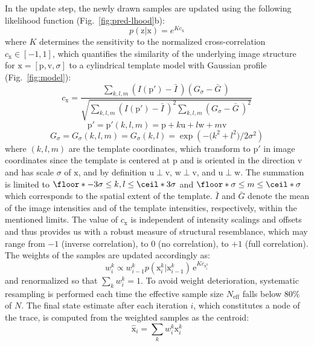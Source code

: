 In the update step, the newly drawn samples are updated using the following likelihood function (Fig.~\ref{fig:pred-lhood}b):
\begin{equation}
p(\mathrm{z} | \mathrm{x}) = e^{K c_{\mathrm{x}}}
\end{equation}
where $K$ determines the sensitivity to the normalized cross-correlation $c_{\mathrm{x}}\in[-1,1]$, which quantifies the similarity of the underlying image structure for $\mathrm{x}=\left[ \mathrm{p}, \mathrm{v}, \sigma \right]$ to a cylindrical template model with Gaussian profile (Fig.~\ref{fig:model}):
\begin{equation}
\label{eq:corr}
c_\mathrm{x} = 
\frac{
\sum_{k,l,m}
\left(I(\mathrm{p}')-\bar{I}\,\right) \left(G_{\sigma}-\bar{G}\,\right)
}{
\!\!\sqrt{
\sum_{k,l,m}\left(I(\mathrm{p}')-\bar{I}\,\right)^2
\sum_{k,l,m}\left(G_{\sigma}-\bar{G}\,\right)^2}
}
\end{equation}
\begin{equation}
\label{eq:pp}
\mathrm{p}' = \mathrm{p}'(k,l,m) =  \mathrm{p} + k \mathrm{u} + l \mathrm{w} + m \mathrm{v}
\end{equation}
\begin{equation}
\label{eq:template}
G_{\sigma} = G_{\sigma}(k,l,m)=G_{\sigma}(k,l)=\exp\left(-\big(k^2+l^2\big)/2\sigma^2\right)
\end{equation} 
where $(k,l,m)$ are the template coordinates, which transform to $\mathrm{p}'$ in image coordinates since the template is centered at $\mathrm{p}$ and is oriented in the direction $\mathrm{v}$ and has  scale $\sigma$ of $\mathrm{x}$, and by definition $\mathrm{u} \! \perp \! \mathrm{v}$, $\mathrm{w} \! \perp \! \mathrm{v}$, and $\mathrm{u} \! \perp \! \mathrm{w}$. The summation is limited to $\floor*{-3\sigma} \leq k, l \leq \ceil*{3\sigma}$ and $\floor*{\sigma} \leq m \leq \ceil*{\sigma}$ which corresponds to the spatial extent of the template. $\bar{I}$ and $\bar{G}$ denote the mean of the image intensities and of the template intensities, respectively, within the mentioned limits. The value of $c_\mathrm{x}$ is independent of intensity scalings and offsets and thus provides us with a robust measure of structural resemblance, which may range from $-1$ (inverse correlation), to $0$ (no correlation), to $+1$ (full correlation). The weights of the samples are updated accordingly as:
\begin{equation} 
\label{eq:w-update}
w_i^k \propto w_{i-1}^k
p(\mathrm{x}_{i}^k | \mathrm{x}_{i-1}^k)
\,\textrm{e}^{K c_{\mathrm{x}_i^k}}
\end{equation}
and renormalized so that $\sum_k w_i^k = 1$. To avoid weight deterioration, systematic resampling \citep{kitagawa1996monte} is performed each time the effective sample size $N_{\text{eff}}$ \citep{kong1994sequential} falls below 80\% of $N$. The final state estimate after each iteration $i$, which constitutes a node of the trace, is computed from the weighted samples as the centroid:
\begin{equation} 
\hat{\mathrm{x}}_i = \sum_k w_i^k \mathrm{x}_i^k
\end{equation} 

